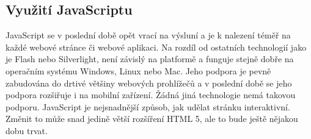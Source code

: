 \subsection{Využití JavaScriptu}

JavaScript se v poslední době opět vrací na výsluní a je k nalezení téměř na každé webové stránce či webové aplikaci. Na rozdíl od ostatních technologií jako je Flash\cite{flash} nebo Silverlight\cite{silverlight}, není závislý na platformě a funguje stejně dobře na operačním systému Windows, Linux nebo Mac. Jeho podpora je pevně zabudována do drtivé většiny webových prohlížečů a v poslední době se jeho podpora rozšiřuje i na mobilní zařízení. Žádná jiná technologie nemá takovou podporu. JavaScript je nejsnadnější způsob, jak udělat stránku interaktivní. Změnit to může snad jedině větší rozšíření HTML 5, ale to bude ještě nějakou dobu trvat.